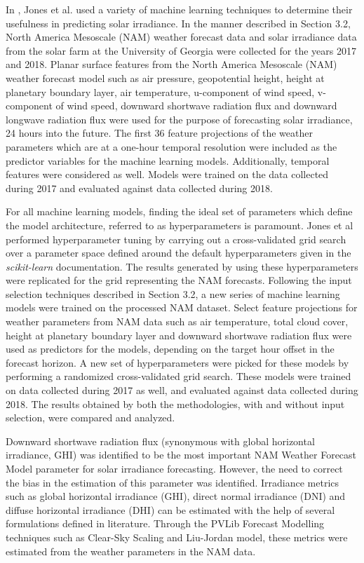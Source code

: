 \par In \cite{thesis_zach}, Jones et al. used a variety of machine learning techniques to determine their usefulness in predicting solar irradiance. In the manner described in Section 3.2, North America Mesoscale (NAM) weather forecast data and solar irradiance data from the solar farm at the University of Georgia were collected for the years 2017 and 2018. Planar surface features from the North America Mesoscale (NAM) weather forecast model such as air pressure, geopotential height, height at planetary boundary layer, air temperature, u-component of wind speed, v-component of wind speed, downward shortwave radiation flux and downward longwave radiation flux were used for the purpose of forecasting solar irradiance, 24 hours into the future. The first 36 feature projections of the weather parameters which are at a one-hour temporal resolution were included as the predictor variables for the machine learning models. Additionally, temporal features were considered as well. Models were trained on the data collected during 2017 and evaluated against data collected during 2018.

\par For all machine learning models, finding the ideal set of parameters which define the model architecture, referred to as hyperparameters is paramount. Jones et al performed hyperparameter tuning by carrying out a cross-validated grid search over a parameter space defined around the default hyperparameters given in the \textit{scikit-learn} documentation. The results generated by using these hyperparameters were replicated for the grid representing the NAM forecasts. Following the input selection techniques described in Section 3.2, a new series of machine learning models were trained on the processed NAM dataset. Select feature projections for weather parameters from NAM data such as air temperature, total cloud cover, height at planetary boundary layer and downward shortwave radiation flux were used as predictors for the models, depending on the target hour offset in the forecast horizon. A new set of hyperparameters were picked for these models by performing a randomized cross-validated grid search. These models were trained on data collected during 2017 as well, and evaluated against data collected during 2018. The results obtained by both the methodologies, with and without input selection, were compared and analyzed.

\par Downward shortwave radiation flux (synonymous with global horizontal irradiance, GHI) was identified to be the most important NAM Weather Forecast Model parameter for solar irradiance forecasting. However, the need to correct the bias in the estimation of this parameter was identified. Irradiance metrics such as global horizontal irradiance (GHI), direct normal irradiance (DNI) and diffuse horizontal irradiance (DHI) can be estimated with the help of several formulations defined in literature. Through the PVLib Forecast Modelling techniques such as Clear-Sky Scaling and Liu-Jordan model, these metrics were estimated from the weather parameters in the NAM data.

